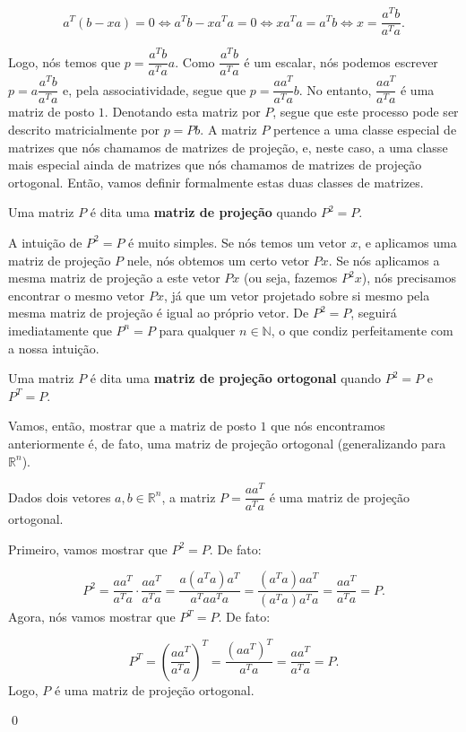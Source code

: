 $$
a^T(b - xa) = 0\iff a^Tb - xa^Ta = 0\iff xa^Ta = a^Tb\iff x = \dfrac{a^Tb}{a^Ta}.
$$

Logo, nós temos que $p = \dfrac{a^Tb}{a^Ta}a$. Como $\dfrac{a^Tb}{a^Ta}$ é um escalar, nós podemos escrever $p = a\dfrac{a^Tb}{a^Ta}$ e, pela associatividade, segue que $p = \dfrac{aa^T}{a^Ta}b$. No entanto, $\dfrac{aa^T}{a^Ta}$ é uma matriz de posto $1$. Denotando esta matriz por $P$, segue que este processo pode ser descrito matricialmente por $p = Pb$. A matriz $P$ pertence a uma classe especial de matrizes que nós chamamos de matrizes de projeção, e, neste caso, a uma classe mais especial ainda de matrizes que nós chamamos de matrizes de projeção ortogonal. Então, vamos definir formalmente estas duas classes de matrizes.

\begin{Definition}
	Uma matriz $P$ é dita uma \textbf{matriz de projeção} quando $P^2 = P$.
\end{Definition}

A intuição de $P^2 = P$ é muito simples. Se nós temos um vetor $x$, e aplicamos uma matriz de projeção $P$ nele, nós obtemos um certo vetor $Px$. Se nós aplicamos a mesma matriz de projeção a este vetor $Px$ (ou seja, fazemos $P^2x$), nós precisamos encontrar o mesmo vetor $Px$, já que um vetor projetado sobre si mesmo pela mesma matriz de projeção é igual ao próprio vetor. De $P^2 = P$, seguirá imediatamente que $P^n = P$ para qualquer $n\in\mathbb{N}$, o que condiz perfeitamente com a nossa intuição.

\begin{Definition}
	Uma matriz $P$ é dita uma \textbf{matriz de projeção ortogonal} quando $P^2 = P$ e $P^T = P$.
\end{Definition}

Vamos, então, mostrar que a matriz de posto $1$ que nós encontramos anteriormente é, de fato, uma matriz de projeção ortogonal (generalizando para $\mathbb{R}^n$).

\begin{Proposition}
	Dados dois vetores $a,b\in\mathbb{R}^n$, a matriz $P = \dfrac{aa^T}{a^Ta}$ é uma matriz de projeção ortogonal.
\end{Proposition}

\begin{Proof}
	Primeiro, vamos mostrar que $P^2 = P$. De fato:
	
	$$
	P^2 = \dfrac{aa^T}{a^Ta}\cdot\dfrac{aa^T}{a^Ta} = \dfrac{a(a^Ta)a^T}{a^Taa^Ta} = \dfrac{(a^Ta)aa^T}{(a^Ta)a^Ta} = \dfrac{aa^T}{a^Ta} = P.
	$$
	Agora, nós vamos mostrar que $P^T = P$. De fato:
	
	$$
	P^T = \left(\dfrac{aa^T}{a^Ta}\right)^T = \dfrac{(aa^T)^T}{a^Ta} = \dfrac{aa^T}{a^Ta} = P.
	$$
	Logo, $P$ é uma matriz de projeção ortogonal.
	
	\qed
\end{Proof}

